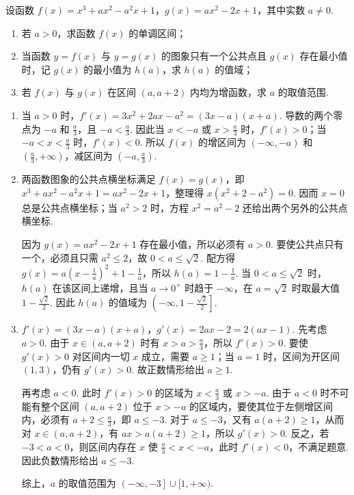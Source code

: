 \begin{problem}
设函数 \( f(x) = x^{3} + ax^{2} - a^{2}x + 1 \)，\( g(x) = ax^{2} - 2x + 1 \)，其中实数 \( a \neq 0 \). 
\begin{enumerate}
\item 若 \(a > 0\)，求函数 \(f(x)\) 的单调区间；
\item 当函数 \( y = f(x) \) 与 \( y = g(x) \) 的图象只有一个公共点且 \( g(x) \) 存在最小值时，记 \( g(x) \) 的最小值为 \( h(a) \)，求 \( h(a) \) 的值域；
\item 若 \( f(x) \) 与 \( g(x) \) 在区间 \((a, a + 2)\) 内均为增函数，求 \( a \) 的取值范围.
\end{enumerate}
\end{problem}

\begin{solution}
\begin{enumerate}
\item 当 \(a>0\) 时，\(f'(x)=3x^2+2ax-a^2=(3x-a)(x+a)\). 导数的两个零点为 \(-a\) 和 \(\frac{a}{3}\)，且 \(-a<\frac{a}{3}\). 因此当 \(x<-a\) 或 \(x>\frac{a}{3}\) 时，\(f'(x)>0\)；当 \(-a<x<\frac{a}{3}\) 时，\(f'(x)<0\). 所以 \(f(x)\) 的增区间为 \((-\infty,-a)\) 和 \(\left(\frac{a}{3},+\infty\right)\)，减区间为 \(\left(-a,\frac{a}{3}\right)\).
\item 两函数图象的公共点横坐标满足 \(f(x)=g(x)\)，即 \(x^3+ax^2-a^2x+1=ax^2-2x+1\)，整理得 \(x\left(x^2+2-a^2\right)=0\). 因而 \(x=0\) 总是公共点横坐标；当 \(a^2>2\) 时，方程 \(x^2=a^2-2\) 还给出两个另外的公共点横坐标.

因为 \(g(x)=ax^2-2x+1\) 存在最小值，所以必须有 \(a>0\). 要使公共点只有一个，必须且只需 \(a^2\leqslant2\)，故 \(0<a\leqslant\sqrt{2}\). 配方得 \(g(x)=a\left(x-\frac{1}{a}\right)^2+1-\frac{1}{a}\)，所以 \(h(a)=1-\frac{1}{a}\). 当 \(0<a\leqslant\sqrt{2}\) 时，\(h(a)\) 在该区间上递增，且当 \(a\to0^+\) 时趋于 \(-\infty\)，在 \(a=\sqrt{2}\) 时取最大值 \(1-\frac{\sqrt{2}}{2}\). 因此 \(h(a)\) 的值域为 \(\left(-\infty,1-\frac{\sqrt{2}}{2}\right]\).
\item \(f'(x)=(3x-a)(x+a)\)，\(g'(x)=2ax-2=2(ax-1)\). 先考虑 \(a>0\). 由于 \(x\in(a,a+2)\) 时有 \(x>a>\frac{a}{3}\)，所以 \(f'(x)>0\). 要使 \(g'(x)>0\) 对区间内一切 \(x\) 成立，需要 \(a\geqslant1\)；当 \(a=1\) 时，区间为开区间 \((1,3)\)，仍有 \(g'(x)>0\). 故正数情形给出 \(a\geqslant1\).

再考虑 \(a<0\). 此时 \(f'(x)>0\) 的区域为 \(x<\frac{a}{3}\) 或 \(x>-a\). 由于 \(a<0\) 时不可能有整个区间 \((a,a+2)\) 位于 \(x>-a\) 的区域内，要使其位于左侧增区间内，必须有 \(a+2\leqslant\frac{a}{3}\)，即 \(a\leqslant-3\). 对于 \(a\leqslant-3\)，又有 \(a(a+2)\geqslant1\)，从而对 \(x\in(a,a+2)\)，有 \(ax>a(a+2)\geqslant1\)，所以 \(g'(x)>0\). 反之，若 \(-3<a<0\)，则区间内存在 \(x\) 使 \(\frac{a}{3}<x<-a\)，此时 \(f'(x)<0\)，不满足题意. 因此负数情形给出 \(a\leqslant-3\).

综上，\(a\) 的取值范围为 \(\left(-\infty,-3\right]\cup[1,+\infty)\).
\end{enumerate}
\end{solution}
